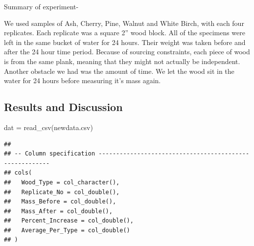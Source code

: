 \documentclass[
]{article}
\newenvironment{Shaded}{\begin{snugshade}}{\end{snugshade}}
\newcommand{\AttributeTok}[1]{\textcolor[rgb]{0.77,0.63,0.00}{#1}}
\newcommand{\FunctionTok}[1]{\textcolor[rgb]{0.00,0.00,0.00}{#1}}
\newcommand{\NormalTok}[1]{#1}
\newcommand{\OtherTok}[1]{\textcolor[rgb]{0.56,0.35,0.01}{#1}}
\newcommand{\SpecialCharTok}[1]{\textcolor[rgb]{0.00,0.00,0.00}{#1}}
\newcommand{\StringTok}[1]{\textcolor[rgb]{0.31,0.60,0.02}{#1}}
\begin{document}
Summary of experiment-

We used samples of Ash, Cherry, Pine, Walnut and White Birch, with each
four replicates. Each replicate was a square 2'' wood block. All of the
specimens were left in the same bucket of water for 24 hours. Their
weight was taken before and after the 24 hour time period. Because of
sourcing constraints, each piece of wood is from the same plank, meaning
that they might not actually be independent. Another obstacle we had was
the amount of time. We let the wood sit in the water for 24 hours before
measuring it's mass again.

\hypertarget{results-and-discussion}{%
\subsection{Results and Discussion}\label{results-and-discussion}}

\begin{Shaded}
\begin{Highlighting}[]
\NormalTok{dat }\OtherTok{=} \FunctionTok{read\_csv}\NormalTok{(}\StringTok{\textquotesingle{}newdata.csv\textquotesingle{}}\NormalTok{)}
\end{Highlighting}
\end{Shaded}

\begin{verbatim}
## 
## -- Column specification --------------------------------------------------------
## cols(
##   Wood_Type = col_character(),
##   Replicate_No = col_double(),
##   Mass_Before = col_double(),
##   Mass_After = col_double(),
##   Percent_Increase = col_double(),
##   Average_Per_Type = col_double()
## )
\end{verbatim}

\begin{Shaded}
\end{Shaded}
\end{document}
